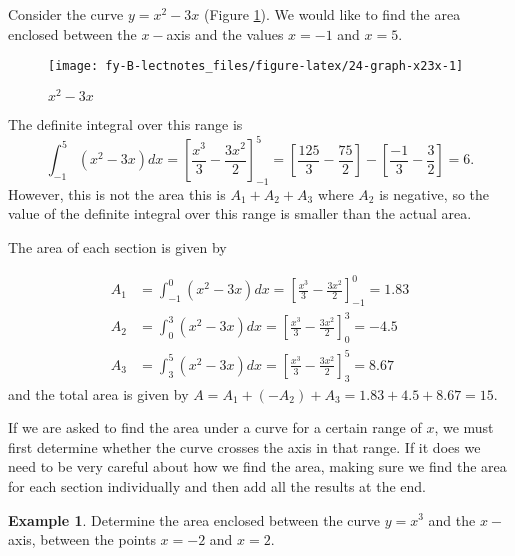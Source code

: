 \documentclass[
  11pt,
  oneside]{book}
\newcommand{\slide}{}
\theoremstyle{definition}
\theoremstyle{definition}
\newtheorem{example}{Example}[chapter]
\theoremstyle{definition}
\theoremstyle{definition}
\theoremstyle{remark}
\begin{document}
Consider the curve \(y = x^2 - 3x\) (Figure \ref{fig:24-graph-x23x}). We would like to find the area enclosed between the \(x-\)axis and the values \(x = -1\) and \(x = 5\).

\begin{figure}

{\centering \texttt{[image: fy-B-lectnotes\_files/figure-latex/24-graph-x23x-1]} 

}

\caption{$x^2-3x$}\label{fig:24-graph-x23x}
\end{figure}

The definite integral over this range is
\[
\int_{-1}^5(x^2-3x)dx = \left[\frac{x^3}3-\frac{3x^2}2\right]_{-1}^5 = \left[\frac{125}3-\frac{75}2\right]-\left[\frac{-1}3-\frac{3}2\right]=6.
\]
However, this is not the area this is \(A_1 + A_2 + A_3\) where \(A_2\) is negative, so the value of the definite integral over this range is smaller than the actual area.

The area of each section is given by

\begin{align*}
A_1&=\int_{-1}^0(x^2-3x)dx = \left[\frac{x^3}3-\frac{3x^2}2\right]_{-1}^0 = 1.83\\
A_2&=\int_{0}^3(x^2-3x)dx = \left[\frac{x^3}3-\frac{3x^2}2\right]_{0}^3 = -4.5\\
A_3&=\int_{3}^5(x^2-3x)dx = \left[\frac{x^3}3-\frac{3x^2}2\right]_{3}^5 = 8.67
\end{align*}
and the total area is given by \(A = A_1 + (-A_2) + A_3 = 1.83 + 4.5 + 8.67 = 15\).

If we are asked to find the area under a curve for a certain range of \(x\), we must first determine whether the curve crosses the axis in that range. If it does we need to be very careful about how we find the area, making sure we find the area for each section individually and then add all the results at the end.

\slide

\begin{example}
Determine the area enclosed between the curve \(y=x^3\) and the \(x-\)axis, between the points \(x=-2\) and \(x=2\).
\end{example}
\end{document}

